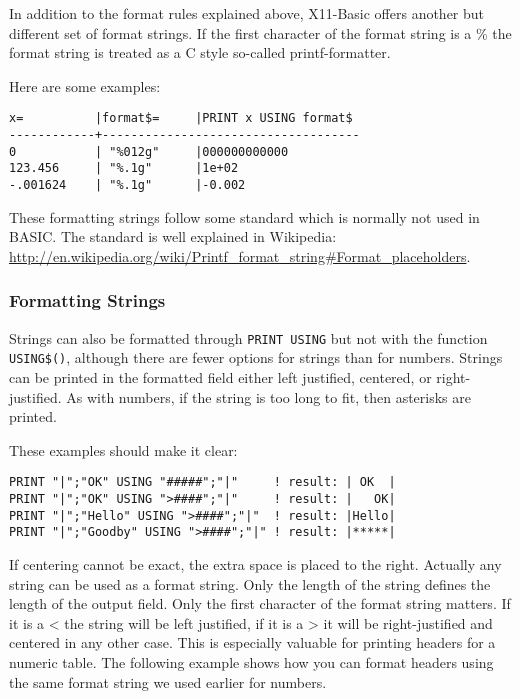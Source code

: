 In addition to the format rules explained above, X11-Basic offers another but
different set of format strings. If the first character of the format string 
is a \% the format string is treated as a C style so-called printf-formatter.

Here are some examples:

\begin{verbatim}
x=          |format$=     |PRINT x USING format$
------------+------------------------------------
0           | "%012g"     |000000000000
123.456     | "%.1g"      |1e+02
-.001624    | "%.1g"      |-0.002
\end{verbatim}

These formatting strings follow some standard which is normally not used in
BASIC. The standard is well explained in Wikipedia: 
\url{http://en.wikipedia.org/wiki/Printf_format_string#Format_placeholders}.

\subsubsection*{Formatting Strings}

Strings can also be formatted through \verb|PRINT USING| but not with the 
function \verb|USING$()|, although there are fewer options for strings than 
for numbers. Strings can be printed in the formatted field either 
left justified, centered, or right-justified. 
As with numbers, if the string is too long to fit, then asterisks are printed. 

These examples should make it clear:
\begin{mdframed}[hidealllines=true,backgroundcolor=blue!20]
\begin{verbatim}
PRINT "|";"OK" USING "#####";"|"     ! result: | OK  |
PRINT "|";"OK" USING ">####";"|"     ! result: |   OK|
PRINT "|";"Hello" USING ">####";"|"  ! result: |Hello|
PRINT "|";"Goodby" USING ">####";"|" ! result: |*****|
\end{verbatim}
\end{mdframed}

If centering cannot be exact, the extra space is placed to the right. Actually
any string can be used as a format string. Only the length of the string
defines the length of the output field. Only the first character of the format
string matters. If it is a < the string will be left justified, if it is a > it
will be right-justified and centered in any other case. This is especially
valuable for printing headers for a numeric table. The following example shows
how you can format headers using the same format string we used earlier for
numbers.

